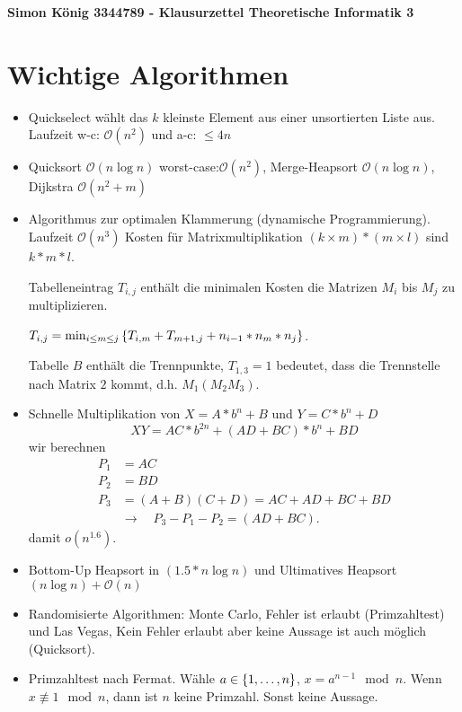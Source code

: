\documentclass[landscape, 8pt, a4paper]{extarticle}
\newcommand{\simpleset}[1]{\ensuremath\left\{ #1 \right\}}
\renewcommand{\O}{\mathcal O}
\begin{document}
\begin{multicols}{3}
\raggedbottom
	\textbf{Simon König 3344789 - Klausurzettel Theoretische Informatik 3}

	\section{Wichtige Algorithmen}
	\begin{itemize}
		\item Quickselect wählt das $k$ kleinste Element aus einer unsortierten Liste aus. Laufzeit w-c: $\O(n^2)$ und a-c: $\leq4n$
		\item Quicksort $\O(n\log n)$ worst-case:$\O(n^2)$, Merge-Heapsort $\O(n\log n)$, Dijkstra $\O(n^2+m)$

		\item Algorithmus zur optimalen Klammerung (dynamische Programmierung). Laufzeit $\O(n^3)$
		Kosten für Matrixmultiplikation $(k\times m)*(m\times l)$ sind $k*m*l$.

		Tabelleneintrag $T_{i,j}$ enthält die minimalen Kosten die Matrizen $M_i$ bis $M_j$ zu multiplizieren.

		$T_{i,j}=\min_{i\leq m\leq j}\simpleset{T_{i,m}+T_{m+1,j}+n_{i-1}*n_{m}*n_{j}}$.

		Tabelle $B$ enthält die Trennpunkte, $T_{1,3}=1$ bedeutet, dass die Trennstelle nach Matrix $2$ kommt, d.h. $M_1(M_2M_3)$.

		\item Schnelle Multiplikation von $X=A*b^n+B$ und $Y=C*b^n+D$
		\begin{equation*}
			XY=AC*b^{2n}+(AD+BC)*b^n+BD
		\end{equation*}
		wir berechnen
		\begin{align*}
			P_1&=AC\\
			P_2&=BD\\
			P_3&=(A+B)(C+D)=AC+AD+BC+BD\\
			&\rightarrow \quad P_3-P_1-P_2=(AD+BC).
		\end{align*}
		damit $o(n^{1.6})$.

		\item Bottom-Up Heapsort in $(1.5*n\log n)$ und Ultimatives Heapsort $(n\log n) + \O(n)$

		\item Randomisierte Algorithmen: Monte Carlo, Fehler ist erlaubt (Primzahltest) und Las Vegas, Kein Fehler erlaubt aber keine Aussage ist auch möglich (Quicksort). 

		\item Primzahltest nach Fermat. Wähle $a\in\simpleset{1,\ldots,n}$, $x=a^{n-1}\mod n$. Wenn $x\not\equiv 1\mod n$, dann ist $n$ keine Primzahl. Sonst keine Aussage.


\end{itemize}
\end{multicols}
\end{document}
